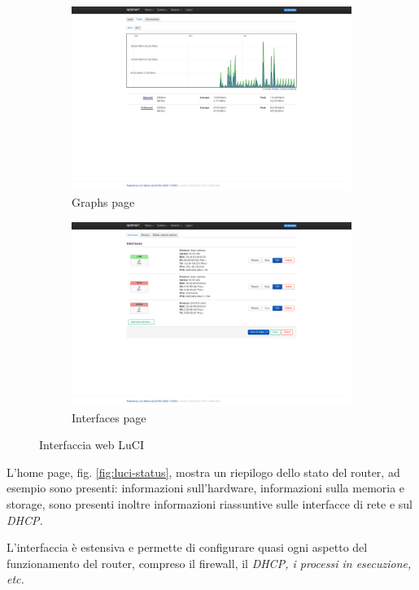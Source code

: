 \begin{figure}[H]
    \begin{subfigure}{0.5\linewidth}
        \centering
        \includegraphics[height=0.65\linewidth]{immagini/LuCI_graphs}
        \caption{Graphs page}
        \label{fig:luci-graphs}
    \end{subfigure}%
    \hfill
    \begin{subfigure}{0.5\linewidth}
        \centering
        \includegraphics[height=0.65\linewidth]{immagini/LuCI_interfaces}
        \caption{Interfaces page}
        \label{fig:luci-interfaces}
    \end{subfigure}%
    \caption{Interfaccia web LuCI}
\end{figure}


L'home page, fig. \ref{fig:luci-status}, mostra un riepilogo dello stato del router, ad esempio sono presenti: informazioni sull'hardware, informazioni sulla memoria e storage, sono presenti inoltre informazioni riassuntive sulle interfacce di rete e sul \it{DHCP}.

L'interfaccia è estensiva e permette di configurare quasi ogni aspetto del funzionamento del router, compreso il firewall, il \it{DHCP}, i processi in esecuzione, etc.

